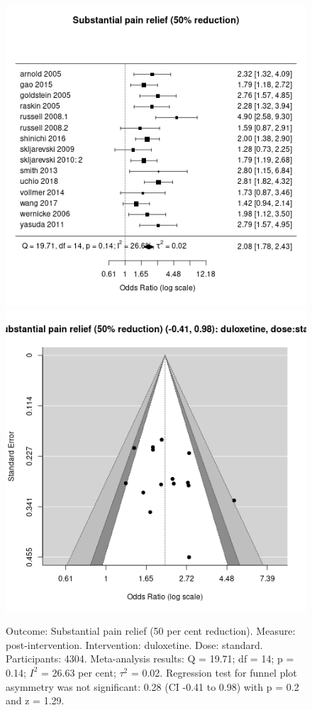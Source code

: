 \documentclass{report}\usepackage[]{graphicx}\usepackage[]{color}
\newenvironment{knitrout}{}{} %
\begin{document}
\begin{figure}

\begin{knitrout}
\color{fgcolor}
\includegraphics[width=0.5\linewidth,height=0.35\textheight]{img/pain_sub-duloxetine-dose-standard-forest} 
\includegraphics[width=0.5\linewidth,height=0.35\textheight]{img/pain_sub-duloxetine-dose-standard-funnel} 
\end{knitrout}

\caption[Substantial pain: duloxetine, standard dose]{Outcome: Substantial pain relief  (50 per cent reduction). Measure: post-intervention. Intervention: duloxetine. Dose: standard. Participants: 4304. Meta-analysis results: Q = 19.71; df = 14; p = 0.14; $I^2$ = 26.63 per cent; $\tau^2$ = 0.02. Regression test for funnel plot asymmetry was not significant: 0.28 (CI -0.41 to 0.98) with p = 0.2 and z = 1.29.
}
\label{fig:subpain-standarddose-dulox}
\end{figure}
\end{document}
